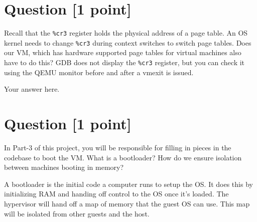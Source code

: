 \documentclass[11pt]{article}
\begin{document}
\section{Question [1 point]}

Recall that the \texttt{\%cr3} register holds the physical address of a page table. An OS kernel needs to change \texttt{\%cr3} during context switches to switch page tables. Does our VM, which has hardware supported page tables for virtual machines also have to do this? GDB does not display the \texttt{\%cr3} register, but you can check it using the QEMU monitor before and after a vmexit is issued.

\begin{solution}
Your answer here.
\end{solution}


\section{Question [1 point]}

In Part-3 of this project, you will be responsible for filling in pieces in the codebase to boot the VM. What is a bootloader? How do we ensure isolation between machines booting in memory?

\begin{solution}
A bootloader is the initial code a computer runs to setup the OS. It does this by initializing RAM and handing off control to the OS once it's loaded. The hypervisor will hand off a map of memory that the guest OS can use. This map will be isolated from other guests and the host.
\end{solution}
\end{document}
